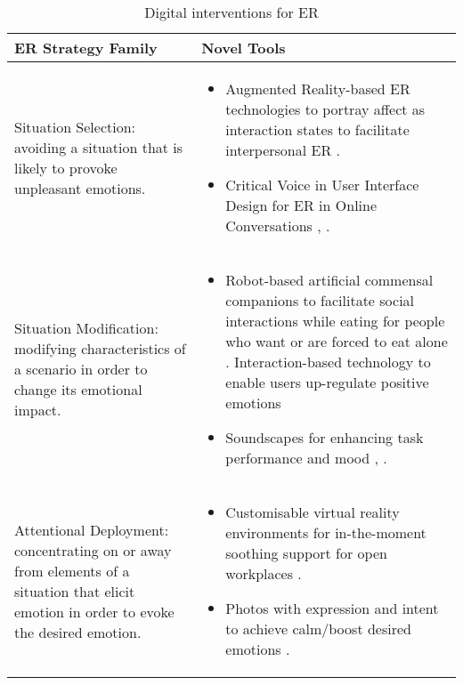\begin{table}[]
\centering
\caption{Digital interventions for ER}
\label{tab:my-table}
\begin{tabular}{m{6cm}m{10cm}}
\hline
\textbf{ER Strategy Family}                                                                                                             & \textbf{Novel Tools}                                                                                                                                                                                                                                                       \\ \hline
Situation Selection: avoiding a situation that is likely to provoke unpleasant emotions.                                                 & \begin{itemize}
\item Augmented Reality-based ER technologies to portray affect as interaction states to facilitate interpersonal ER \cite{semertzidis2020neo}.
\item Critical Voice in User Interface Design for ER in Online Conversations \cite{kiskola2021applying}, \cite{kou2020emotion}.
\end{itemize}                             \\ \hline
Situation Modification: modifying characteristics of a scenario in order to change its emotional impact.                                 & \begin{itemize}
\item Robot-based artificial commensal companions to facilitate social interactions while eating for people who want or are forced to eat alone \cite{mancini2020room}. Interaction-based technology to enable users up-regulate positive emotions \cite{li2020purpal}
\item Soundscapes for enhancing task performance and mood \cite{newbold2017using}, \cite{yu2018delight}.
\end{itemize}                 \\ \hline
Attentional Deployment: concentrating on or away from elements of a situation that elicit emotion in order to evoke the desired emotion. & \begin{itemize}
\item Customisable virtual reality environments for in-the-moment soothing support for open workplaces \cite{ruvimova2020transport}.
\item Photos with expression and intent to achieve calm/boost desired emotions \cite{chen2016promoting}.

\end{itemize}
\end{tabular}
\end{table}
